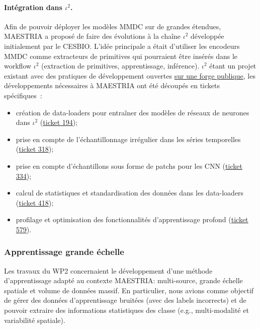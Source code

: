 \paragraph{Intégration dans $\iota^2$.}
Afin de pouvoir déployer les modèles MMDC sur de grandes étendues, MAESTRIA a proposé de faire des évolutions à la chaîne $\iota^2$ développée initialement par le CESBIO. L’idée principale a était d’utiliser les encodeurs MMDC comme extracteurs de primitives qui pourraient être insérés dans le workflow $\iota^2$ (extraction de primitives, apprentissage, inférence). $\iota^2$ étant un projet existant avec des pratiques de développement ouvertes \href{https://framagit.org/iota2-project/iota2}{sur une forge publique}, les développements nécessaires à MAESTRIA ont été découpés en tickets spécifiques :
\begin{itemize}
\item création de data-loaders pour entraîner des modèles de réseaux de neurones dans $\iota^2$ (\href{https://framagit.org/iota2-project/iota2/-/issues/194}{ticket 194});
\item prise en compte de l’échantillonnage irrégulier dans les séries temporelles (\href{https://framagit.org/iota2-project/iota2/-/issues/318}{ticket 318});
\item prise en compte d’échantillons sous forme de patchs pour les CNN (\href{https://framagit.org/iota2-project/iota2/-/issues/334}{ticket 334});
\item calcul de statistiques et standardisation des données dans les data-loaders (\href{https://framagit.org/iota2-project/iota2/-/issues/418}{ticket 418});
\item profilage et optimisation des fonctionnalités d’apprentissage profond (\href{https://framagit.org/iota2-project/iota2/-/issues/579}{ticket 579}).
  
\end{itemize}


\subsubsection{Apprentissage grande échelle}
Les travaux du WP2 concernaient le développement d'une méthode d'apprentissage adapté au contexte MAESTRIA: multi-source, grande échelle spatiale et volume de données massif. En particulier, nous avions comme objectif de gérer des données d'apprentissage bruitées (avec des labels incorrects) et de pouvoir extraire des informations statistiques des classe (e.g., multi-modalité et variabilité spatiale).

